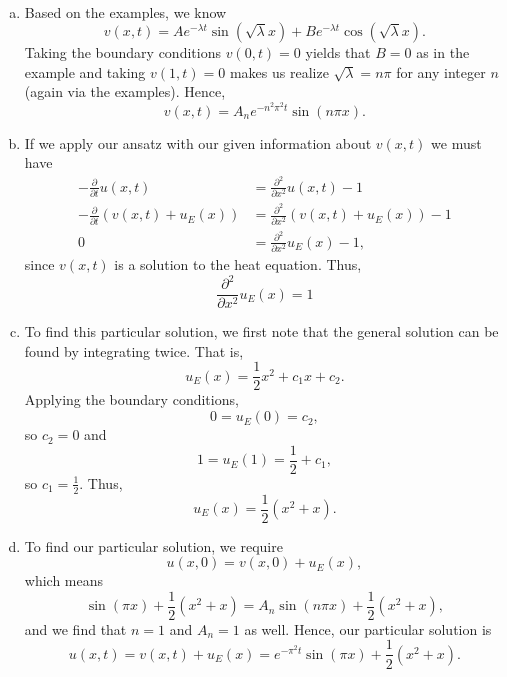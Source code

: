 \documentclass[12pt]{article} %
\begin{document}
\begin{solution}~
    \begin{enumerate}[(a)]
    \item Based on the examples, we know
    \[
    v(x,t) = Ae^{-\lambda t} \sin(\sqrt{\lambda}x)+B e^{-\lambda t} \cos(\sqrt{\lambda}x).
    \]
    Taking the boundary conditions $v(0,t)=0$ yields that $B=0$ as in the example and taking $v(1,t)=0$ makes us realize $\sqrt{\lambda} = n\pi$ for any integer $n$ (again via the examples). Hence, 
    \[
    v(x,t) = A_n e^{-n^2 \pi^2 t} \sin(n\pi x).
    \]

    \item If we apply our ansatz with our given information about $v(x,t)$ we must have
    \begin{align*}
    -\frac{\partial}{\partial t}u(x,t) &= \frac{\partial^2}{\partial x^2}u(x,t)-1\\
     -\frac{\partial}{\partial t}(v(x,t)+u_E(x)) &= \frac{\partial^2}{\partial x^2}(v(x,t)+u_E(x))-1\\
    0 &= \frac{\partial^2}{\partial x^2}u_E(x)-1,
    \end{align*}
    since $v(x,t)$ is a solution to the heat equation. Thus,
    \[
    \frac{\partial^2}{\partial x^2}u_E(x)=1
    \]

    \item To find this particular solution, we first note that the general solution can be found by integrating twice. That is,
    \[
    u_E(x) = \frac{1}{2}x^2+c_1x+c_2.
    \]
    Applying the boundary conditions,
    \[
    0=u_E(0)=c_2,
    \]
    so $c_2=0$ and
    \[
    1=u_E(1)=\frac{1}{2}+c_1,
    \]
    so $c_1=\frac{1}{2}$. Thus,
    \[
    u_E(x)=\frac{1}{2}(x^2+x).
    \]

    \item To find our particular solution, we require
    \[
    u(x,0) = v(x,0)+u_E(x),
    \]
    which means
    \[
    \sin\left(\pi x\right) + \frac{1}{2}(x^2+x)= A_n \sin(n\pi x) + \frac{1}{2}(x^2+x),
    \]
    and we find that $n=1$ and $A_n=1$ as well. Hence, our particular solution is
    \[
    u(x,t) = v(x,t)+u_E(x) = e^{-\pi^2 t}\sin\left(\pi x\right) + \frac{1}{2}(x^2+x).
    \]
\end{enumerate}
\end{solution}
\end{document}
